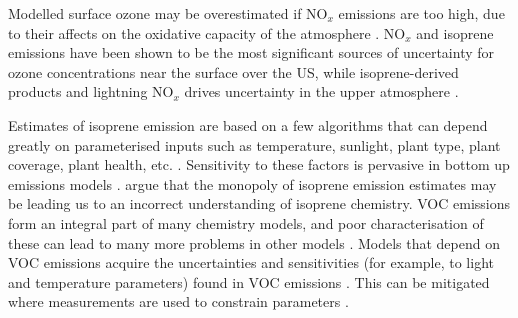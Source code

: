       Modelled surface ozone may be overestimated if NO$_x$ emissions are too high, due to their affects on the oxidative capacity of the atmosphere \parencite{Travis2016}.
      NO$_x$ and isoprene emissions have been shown to be the most significant sources of uncertainty for ozone concentrations near the surface over the US, while isoprene-derived products and lightning NO$_x$ drives uncertainty in the upper atmosphere \parencite{Christian2017}.
      
      
      
      Estimates of isoprene emission are based on a few algorithms that can depend greatly on parameterised inputs such as temperature, sunlight, plant type, plant coverage, plant health, etc. \parencite{Arneth2008, Niinemets2010}.
      Sensitivity to these factors is pervasive in bottom up emissions models 
      \parencite[e.g.,][]{Marais2014, Miller2014, Messina2016}.
      \textcite{Arneth2008} argue that the monopoly of isoprene emission estimates may be leading us to an incorrect understanding of isoprene chemistry.
      VOC emissions form an integral part of many chemistry models, and poor characterisation of these can lead to many more problems in other models \parencite[e.g.,]{Yue2015}.
      Models that depend on VOC emissions acquire the uncertainties and sensitivities (for example, to light and temperature parameters) found in VOC emissions \parencite{Yue2015}.
      This can be mitigated where measurements are used to constrain parameters \parencite[e.g.,][]{Stavrakou2014}.
     
